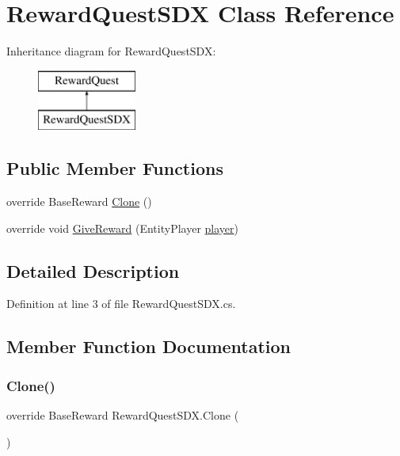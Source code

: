 \hypertarget{class_reward_quest_s_d_x}{}\section{Reward\+Quest\+S\+DX Class Reference}
\label{class_reward_quest_s_d_x}
Inheritance diagram for Reward\+Quest\+S\+DX\+:\begin{figure}[H]
\begin{center}
\leavevmode
\includegraphics[height=2.000000cm]{df/da0/class_reward_quest_s_d_x}
\end{center}
\end{figure}
\subsection*{Public Member Functions}
\begin{DoxyCompactItemize}
\item 
override Base\+Reward \mbox{\hyperlink{class_reward_quest_s_d_x_ae428dcf77db8c60a25f0b30aa9619c2a}{Clone}} ()
\item 
override void \mbox{\hyperlink{class_reward_quest_s_d_x_ae711090cc0e58e20e0b8c92e4a380fe7}{Give\+Reward}} (Entity\+Player \mbox{\hyperlink{_sphere_i_i_01_music_01_boxes_2_config_2_localization_8txt_a4e2cb8aeff651600ea1cc57fe5a929a4}{player}})
\end{DoxyCompactItemize}


\subsection{Detailed Description}


Definition at line 3 of file Reward\+Quest\+S\+D\+X.\+cs.



\subsection{Member Function Documentation}
\mbox{\label{class_reward_quest_s_d_x_ae428dcf77db8c60a25f0b30aa9619c2a}} 
\subsubsection{\texorpdfstring{Clone()}{Clone()}}
{\footnotesize\ttfamily override Base\+Reward Reward\+Quest\+S\+D\+X.\+Clone (\begin{DoxyParamCaption}{ }\end{DoxyParamCaption})}



